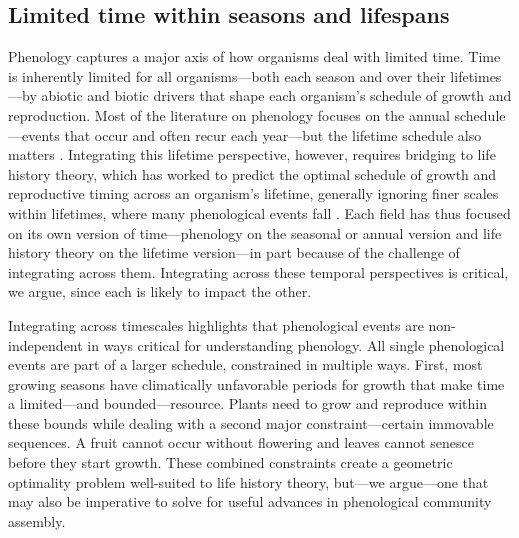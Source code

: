 \documentclass[11pt]{article}
\begin{document}

\subsection*{Limited time within seasons and lifespans} %

Phenology captures a major axis of how organisms deal with limited time. Time is inherently limited for all organisms---both each season and over their lifetimes---by abiotic and biotic drivers that shape each organism's schedule of growth and reproduction. Most of the literature on phenology focuses on the annual schedule---events that occur and often recur each year---but the lifetime schedule also matters \citep{post2008phenological,park2022seasonal}. Integrating this lifetime perspective, however, requires bridging to life history theory, which has worked to predict the optimal schedule of growth and reproductive timing across an organism's lifetime, generally ignoring finer scales within lifetimes, where many phenological events fall \citep[but see][]{ejsmond2010time}. Each field has thus focused on its own version of time---phenology on the seasonal or annual version and life history theory on the lifetime version---in part because of the challenge of integrating across them. Integrating across these temporal perspectives is critical, we argue, since each is likely to impact the other. %

Integrating across timescales highlights that phenological events are non-independent in ways critical for understanding phenology. All single phenological events are part of a larger schedule, constrained in multiple ways. First, most growing seasons have climatically unfavorable periods for growth that make time a limited---and bounded---resource. Plants need to grow and reproduce within these bounds while dealing with a second major constraint---certain immovable sequences. A fruit cannot occur without flowering and leaves cannot senesce before they start growth. These combined constraints create a geometric optimality problem well-suited to life history theory, but---we argue---one that may also be imperative to solve for useful advances in phenological community assembly.
\end{document}
